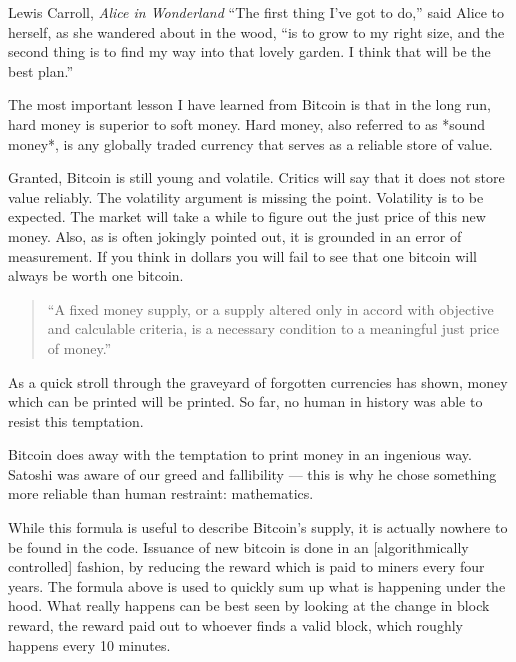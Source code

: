 \label{les:14}

\begin{chapquote}{Lewis Carroll, \textit{Alice in Wonderland}}
``The first thing I've got to do,'' said Alice to herself, as she wandered about
in the wood, ``is to grow to my right size, and the second thing is to find my
way into that lovely garden. I think that will be the best plan.''
\end{chapquote}

The most important lesson I have learned from Bitcoin is that in the
long run, hard money is superior to soft money. Hard money, also
referred to as *sound money*, is any globally traded currency that
serves as a reliable store of value.

Granted, Bitcoin is still young and volatile. Critics will say that it
does not store value reliably. The volatility argument is missing the
point. Volatility is to be expected. The market will take a while to
figure out the just price of this new money. Also, as is often jokingly
pointed out, it is grounded in an error of measurement. If you think in
dollars you will fail to see that one bitcoin will always be worth one
bitcoin.

\begin{quotation}
``A fixed money supply, or a supply altered only in accord with
objective and calculable criteria, is a necessary condition to a
meaningful just price of money.''
\end{quotation}

As a quick stroll through the graveyard of forgotten currencies has
shown, money which can be printed will be printed. So far, no human in
history was able to resist this temptation.

Bitcoin does away with the temptation to print money in an ingenious
way. Satoshi was aware of our greed and fallibility --- this is why he
chose something more reliable than human restraint: mathematics.


While this formula is useful to describe Bitcoin's supply, it is
actually nowhere to be found in the code. Issuance of new bitcoin is
done in an [algorithmically controlled] fashion, by reducing the reward
which is paid to miners every four years. The formula above is used to
quickly sum up what is happening under the hood. What really happens can
be best seen by looking at the change in block reward, the reward paid
out to whoever finds a valid block, which roughly happens every 10
minutes.

